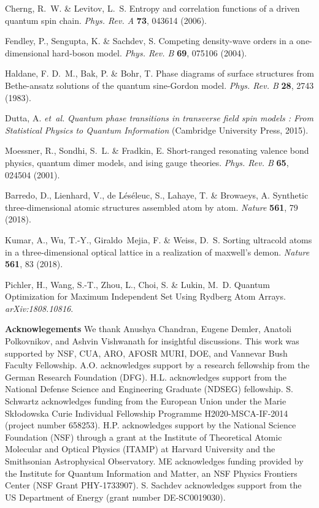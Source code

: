 \documentclass[prl,nobalancelastpage,superscriptaddress,twocolumn,nofootinbib]{revtex4}
\begin{document}
\begin{thebibliography}{}
 Cherng, R.~W. \& Levitov, L.~S. Entropy and correlation functions of a driven quantum spin chain. \emph{Phys. Rev. A} \textbf{73}, 043614 (2006).

 Fendley, P., Sengupta, K. \& Sachdev, S. Competing density-wave orders in a one-dimensional
  hard-boson model. \emph{Phys. Rev. B} \textbf{69}, 075106 (2004).

 Haldane, F. D.~M., Bak, P. \& Bohr, T. {Phase diagrams of surface structures from Bethe-ansatz solutions of the quantum sine-Gordon model}. \emph{Phys. Rev. B} \textbf{28}, 2743 (1983).

 Dutta, A. \emph{et~al.} \emph{{Quantum phase transitions in transverse field spin models : From Statistical Physics to Quantum Information}} ({Cambridge University Press}, 2015).

 Moessner, R., Sondhi, S.~L. \& Fradkin, E. Short-ranged resonating valence bond physics, quantum dimer models, and ising gauge theories. \emph{Phys. Rev. B} \textbf{65}, 024504 (2001).

 Barredo, D., Lienhard, V., {de L{\'e}s{\'e}leuc}, S., Lahaye, T. \& Browaeys, A. Synthetic three-dimensional atomic structures assembled atom by atom. \emph{Nature} \textbf{561}, 79 (2018).

 Kumar, A., Wu, T.-Y., Giraldo~Mejia, F. \& Weiss, D.~S. Sorting ultracold atoms in a three-dimensional optical lattice in a realization of maxwell's demon. \emph{Nature} \textbf{561}, 83 (2018).

 Pichler, H., Wang, S.-T., Zhou, L., Choi, S. \& Lukin, M.~D. {Quantum Optimization for Maximum Independent Set
  Using Rydberg Atom Arrays}. \emph{arXiv:1808.10816}.

\end{thebibliography}

\smallskip\noindent\textbf{Acknowlegements}
We thank Anushya Chandran, Eugene Demler,  Anatoli Polkovnikov, and Ashvin Vishwanath for insightful discussions. This work was supported by NSF, CUA, ARO,  AFOSR MURI, DOE, and Vannevar Bush Faculty Fellowship. A.O. acknowledges support by a research fellowship from the German Research Foundation (DFG). H.L. acknowledges support from the National Defense Science and Engineering Graduate (NDSEG) fellowship. S. Schwartz acknowledges funding from the European Union under the Marie Sk\l odowska Curie Individual Fellowship Programme H2020-MSCA-IF-2014 (project number 658253). H.P. acknowledges support by the National Science Foundation (NSF) through a grant at the Institute of Theoretical Atomic Molecular and Optical Physics (ITAMP) at Harvard University and the Smithsonian Astrophysical Observatory. ME acknowledges funding provided by the Institute for Quantum Information and Matter, an NSF Physics Frontiers Center (NSF Grant PHY-1733907). S. Sachdev acknowledges support from the US Department of Energy (grant number DE-SC0019030).
\end{document}
